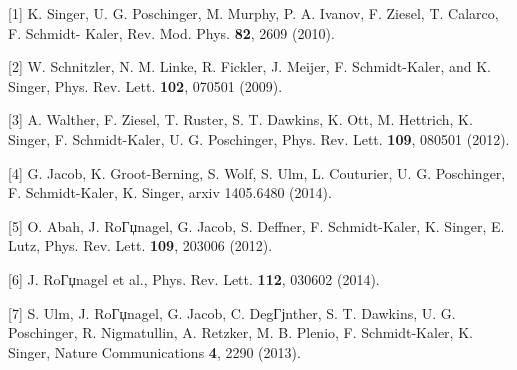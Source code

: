{\normalsize
[1] K. Singer, U. G. Poschinger, M. Murphy, P. A. Ivanov, F. Ziesel, T.
Calarco, F. Schmidt- Kaler, Rev. Mod. Phys. \textbf{82}, 2609 (2010).
\vsp

[2] W. Schnitzler, N. M. Linke, R. Fickler, J. Meijer, F. Schmidt-Kaler,
and K. Singer, Phys. Rev. Lett. \textbf{102}, 070501 (2009).
\vsp

[3] A. Walther, F. Ziesel, T. Ruster, S. T. Dawkins, K. Ott, M.
Hettrich, K. Singer, F. Schmidt-Kaler, U. G. Poschinger, Phys. Rev.
Lett. \textbf{109}, 080501 (2012).
\vsp

[4] G. Jacob, K. Groot-Berning, S. Wolf, S. Ulm, L.
  Couturier, U. G. Poschinger, F. Schmidt-Kaler, K. Singer, arxiv 1405.6480 (2014).
\vsp

[5] O. Abah, J. RoГџnagel, G. Jacob, S. Deffner, F. Schmidt-Kaler, K.
Singer, E. Lutz, Phys. Rev. Lett. \textbf{109}, 203006 (2012).
\vsp

[6] J. RoГџnagel et al., Phys. Rev. Lett. \textbf{112}, 030602 (2014).
\vsp

[7] S. Ulm, J. RoГџnagel, G. Jacob, C. DegГјnther, S. T. Dawkins, U. G.
Poschinger, R. Nigmatullin, A. Retzker, M. B. Plenio, F. Schmidt-Kaler,
K. Singer, Nature Communications \textbf{4}, 2290 (2013).
}

\vspace{\baselineskip}

